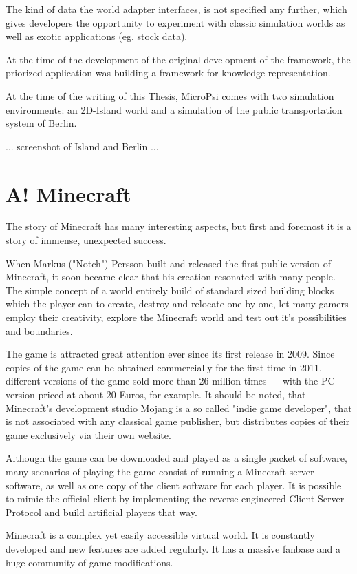 The kind of data the world adapter interfaces, is not specified any further, which gives developers the opportunity to experiment with classic simulation worlds as well as exotic applications (eg. stock data).~\cite{conf/agi/Bach12}

At the time of the development of the original development of the framework, the priorized application was building a framework for knowledge representation.~\cite{conf/agi/Bach12}

At the time of the writing of this Thesis, MicroPsi comes with two simulation environments: an 2D-Island world and a simulation of the public transportation system of Berlin.

... screenshot of Island and Berlin ... %

    \section{A! Minecraft}
The story of Minecraft has many interesting aspects, but first and foremost it is a story of immense, unexpected success.

When Markus ("Notch") Persson built and released the first public version of Minecraft, it soon became clear that his creation resonated with many people. The simple concept of a world entirely build of standard sized building blocks which the player can to create, destroy and relocate one-by-one, let many gamers employ their creativity, explore the Minecraft world and test out it's possibilities and boundaries.

The game is attracted great attention ever since its first release in 2009. Since copies of the game can be obtained commercially for the first time in 2011, different versions of the game sold more than 26 million times --- with the PC version priced at about 20 Euros, for example. It should be noted, that Minecraft's development studio Mojang is a so called "indie game developer", that is not associated with any classical game publisher, but distributes copies of their game exclusively via their own website.

Although the game can be downloaded and played as a single packet of software, many scenarios of playing the game consist of running a Minecraft server software, as well as one copy of the client software for each player. It is possible to mimic the official client by implementing the reverse-engineered Client-Server-Protocol and build artificial players that way.

Minecraft is a complex yet easily accessible virtual world. It is constantly developed and new features are added regularly. It has a massive fanbase and a huge community of game-modifications.


